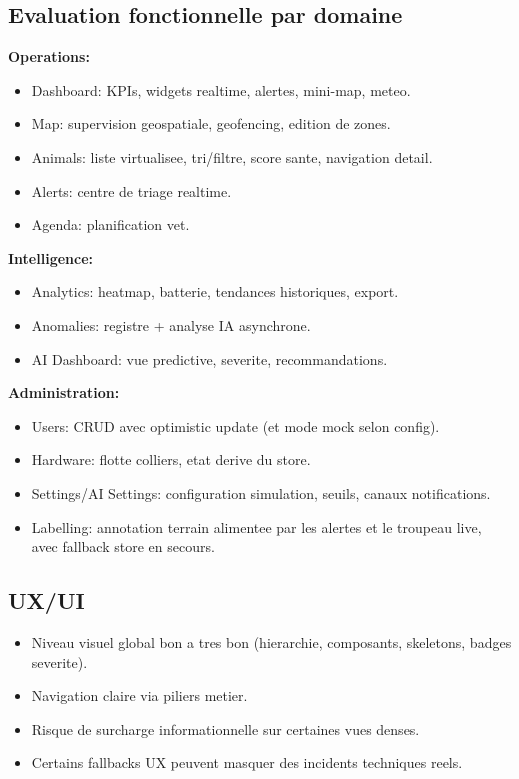 \documentclass[12pt,a4paper]{article}
\begin{document}
\subsection{Evaluation fonctionnelle par domaine}
\textbf{Operations:}
\begin{itemize}
  \item Dashboard: KPIs, widgets realtime, alertes, mini-map, meteo.
  \item Map: supervision geospatiale, geofencing, edition de zones.
  \item Animals: liste virtualisee, tri/filtre, score sante, navigation detail.
  \item Alerts: centre de triage realtime.
  \item Agenda: planification vet.
\end{itemize}

\textbf{Intelligence:}
\begin{itemize}
  \item Analytics: heatmap, batterie, tendances historiques, export.
  \item Anomalies: registre + analyse IA asynchrone.
  \item AI Dashboard: vue predictive, severite, recommandations.
\end{itemize}

\textbf{Administration:}
\begin{itemize}
  \item Users: CRUD avec optimistic update (et mode mock selon config).
  \item Hardware: flotte colliers, etat derive du store.
  \item Settings/AI Settings: configuration simulation, seuils, canaux notifications.
  \item Labelling: annotation terrain alimentee par les alertes et le troupeau live, avec fallback store en secours.
\end{itemize}

\subsection{UX/UI}
\begin{itemize}
  \item Niveau visuel global bon a tres bon (hierarchie, composants, skeletons, badges severite).
  \item Navigation claire via piliers metier.
  \item Risque de surcharge informationnelle sur certaines vues denses.
  \item Certains fallbacks UX peuvent masquer des incidents techniques reels.
\end{itemize}
\end{document}
